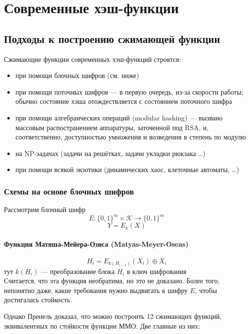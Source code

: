 \chapter{Современные хэш-функции}

\section{Подходы к построению сжимающей функции}

Сжимающие функции современных хэш-функций строятся:

\begin{itemize}
  \item при помощи блочных шифров (см. ниже)
  \item при помощи поточных шифров --- в первую очередь, из-за скорости
  работы; обычно состояние хэша отождествляется с состоянием поточного
  шифра
  \item при помощи алгебраических операций (modular hashing) --- вызвано
  массовым распостранением аппаратуры, заточенной под RSA, и,
  соответственно, доступностью умножения и возведения в степень по
  модулю
  \item на NP-задачах (задачи на решётках, задачи укладки рюкзака \ldots)
  \item при помощи всякой экзотики (динамических хаос, клеточные
  автоматы, \ldots) \\[0.3cm]
\end{itemize}

\subsection{Схемы на основе блочных шифров}
Рассмотрим блочный шифр
\[ E: \{0,1\}^{m} \times \mathcal{K} \rightarrow \{0,1\}^{m} \]
\[Y = E_{k}(X)\]
\subsubsection{Функция Матяша-Мейера-Озиса (Matyas-Meyer-Oseas)}
\[H_{i} = E_{k(H_{i-1})}(X_{i}) \oplus X_{i}\]
тут $k(H_{i})$ --- преобразование блока $H_{i}$ в ключ шифрования \\[0.1cm]

Считается, что эта функция необратима, но это не доказано. Более того,
непонятно даже, какие требования нужно выдвигать к шифру $E$, чтобы
достигалась стойкость.

Однако Пренель доказал, что можно построить 12 сжимающих функций,
эквивалентных по стойкости функции ММО. Две главные из них:

